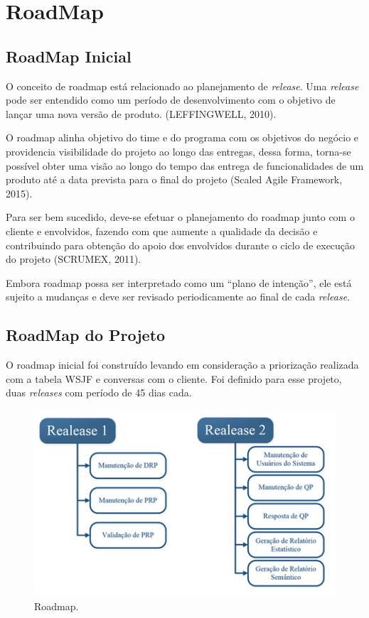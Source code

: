 \section{RoadMap}
	\subsection{RoadMap Inicial}

	O conceito de roadmap está relacionado ao planejamento de \textit{release}. Uma \textit{release} pode ser entendido como um período de desenvolvimento com o objetivo de lançar uma nova versão de produto. (LEFFINGWELL, 2010). 

	O roadmap alinha objetivo do time e do programa com os objetivos do negócio e providencia visibilidade do projeto ao longo das entregas, dessa forma, torna-se possível obter uma visão ao longo do tempo das entrega de funcionalidades de um produto até a data prevista para o final do projeto (Scaled Agile Framework, 2015).

	Para ser bem sucedido, deve-se efetuar o planejamento do roadmap junto com o cliente e envolvidos, fazendo com que aumente a qualidade da decisão e contribuindo para obtenção do apoio dos envolvidos durante o ciclo de execução do projeto (SCRUMEX, 2011). 					
	
	Embora roadmap possa ser interpretado como um “plano de intenção”, ele está sujeito a mudanças e deve ser revisado periodicamente ao final de cada \textit{release}.

	\subsection{RoadMap do Projeto}

	O roadmap inicial foi construído levando em consideração a priorização realizada com a tabela WSJF e conversas com o cliente. Foi definido para esse projeto, duas \textit{releases} com período de 45 dias cada.

	\begin{figure}[h]
		\centering
		\includegraphics{imagens/roadmap1.png}
		\caption{Roadmap.}
		\label{imagem}
	\end{figure}

